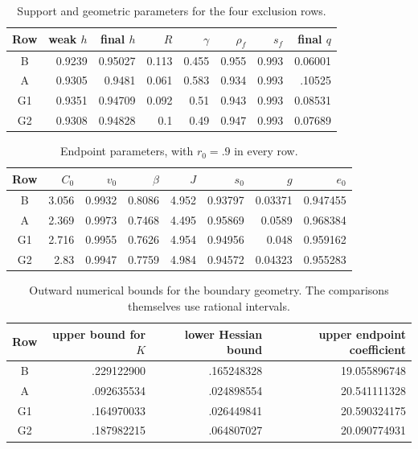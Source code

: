 \begin{table}[ht]
\centering\small
\caption{Support and geometric parameters for the four exclusion rows.}
\label{bc:geometry-table}
\begin{tabular}{@{}crrrrrrr@{}}\toprule
Row&weak $h$&final $h$&$R$&$\gamma$&$\rho_f$&$s_f$&final $q$\\\midrule
B & 0.9239 & 0.95027 & 0.113 & 0.455 & 0.955 & 0.993 & 0.06001\\
A & 0.9305 & 0.9481 & 0.061 & 0.583 & 0.934 & 0.993 & .10525\\
G1 & 0.9351 & 0.94709 & 0.092 & 0.51 & 0.943 & 0.993 & 0.08531\\
G2 & 0.9308 & 0.94828 & 0.1 & 0.49 & 0.947 & 0.993 & 0.07689\\
\bottomrule\end{tabular}
\end{table}
\begin{table}[ht]
\centering\small
\caption{Endpoint parameters, with $r_0=.9$ in every row.}
\label{bc:endpoint-table}
\begin{tabular}{@{}crrrrrrr@{}}\toprule
Row&$C_0$&$v_0$&$\beta$&$J$&$s_0$&$g$&$e_0$\\\midrule
B & 3.056 & 0.9932 & 0.8086 & 4.952 & 0.93797 & 0.03371 & 0.947455\\
A & 2.369 & 0.9973 & 0.7468 & 4.495 & 0.95869 & 0.0589 & 0.968384\\
G1 & 2.716 & 0.9955 & 0.7626 & 4.954 & 0.94956 & 0.048 & 0.959162\\
G2 & 2.83 & 0.9947 & 0.7759 & 4.984 & 0.94572 & 0.04323 & 0.955283\\
\bottomrule\end{tabular}
\end{table}
\begin{table}[ht]
\centering\small
\caption{Outward numerical bounds for the boundary geometry.
The comparisons themselves use rational intervals.}
\label{bc:boundary-margins}
\begin{tabular}{@{}crrr@{}}\toprule
Row&upper bound for $K$&lower Hessian bound&upper endpoint coefficient\\\midrule
B&.229122900&.165248328&19.055896748\\
A&.092635534&.024898554&20.541111328\\
G1&.164970033&.026449841&20.590324175\\
G2&.187982215&.064807027&20.090774931\\\bottomrule
\end{tabular}
\end{table}

